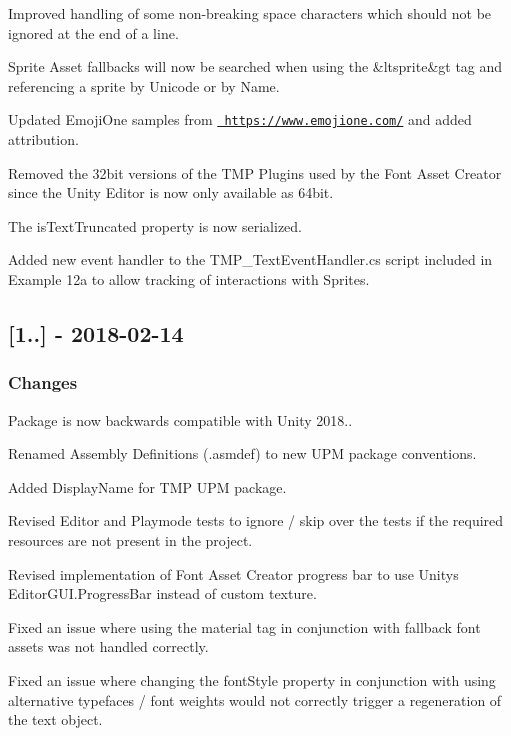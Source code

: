 \begin{DoxyItemize}
\item Improved handling of some non-\/breaking space characters which should not be ignored at the end of a line.
\item Sprite Asset fallbacks will now be searched when using the \&ltsprite\&gt tag and referencing a sprite by Unicode or by Name.
\item Updated Emoji\+One samples from \href{https://www.emojione.com/}{\texttt{ https\+://www.\+emojione.\+com/}} and added attribution.
\item Removed the 32bit versions of the T\+MP Plugins used by the Font Asset Creator since the Unity Editor is now only available as 64bit.
\item The is\+Text\+Truncated property is now serialized.
\item Added new event handler to the T\+M\+P\+\_\+\+Text\+Event\+Handler.\+cs script included in Example 12a to allow tracking of interactions with Sprites.
\end{DoxyItemize}

\subsection*{\mbox{[}1..\mbox{]} -\/ 2018-\/02-\/14}

\subsubsection*{Changes}


\begin{DoxyItemize}
\item Package is now backwards compatible with Unity 2018..
\item Renamed Assembly Definitions (.asmdef) to new U\+PM package conventions.
\item Added Display\+Name for T\+MP U\+PM package.
\item Revised Editor and Playmode tests to ignore / skip over the tests if the required resources are not present in the project.
\item Revised implementation of Font Asset Creator progress bar to use Unity\textquotesingle{}s Editor\+G\+U\+I.\+Progress\+Bar instead of custom texture.
\item Fixed an issue where using the material tag in conjunction with fallback font assets was not handled correctly.
\item Fixed an issue where changing the font\+Style property in conjunction with using alternative typefaces / font weights would not correctly trigger a regeneration of the text object.
\end{DoxyItemize}

